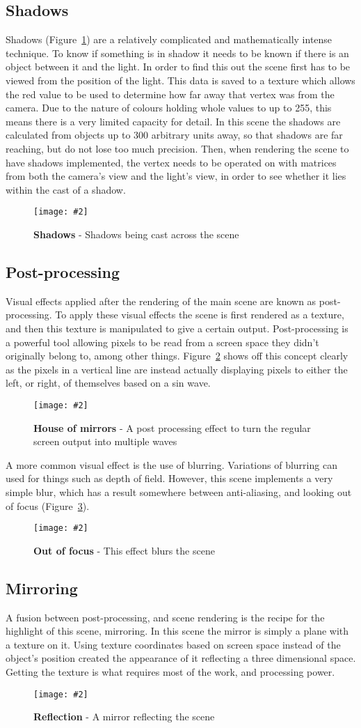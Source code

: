 \documentclass[10pt, a4paper]{article}
\newcommand{\figuremacro}[5]{
    \begin{figure}[#1]
        \centering
        \texttt{[image: \#2]}
        \caption[#3]{\textbf{#3}#4}
        \label{fig:#2}
    \end{figure}
}
\begin{document}
	\subsection{Shadows}
	Shadows (Figure~\ref{fig:shadows}) are a relatively complicated and mathematically intense technique.  To know if something is in shadow it needs to be known if there is an object between it and the light.  In order to find this out the scene first has to be viewed from the position of the light.  This data is saved to a texture which allows the red value to be used to determine how far away that vertex was from the camera.  Due to the nature of colours holding whole values to up to 255, this means there is a very limited capacity for detail.  In this scene the shadows are calculated from objects up to 300 arbitrary units away, so that shadows are far reaching, but do not lose too much precision.  Then, when rendering the scene to have shadows implemented, the vertex needs to be operated on with matrices from both the camera's view and the light's view, in order to see whether it lies within the cast of a shadow.
	\figuremacro{h}{shadows}{Shadows}{ - Shadows being cast across the scene}{1.0}
	
	\subsection{Post-processing}
	Visual effects applied after the rendering of the main scene are known as post-processing.  To apply these visual effects the scene is first rendered as a texture, and then this texture is manipulated to give a certain output. Post-processing is a powerful tool allowing pixels to be read from a screen space they didn't originally belong to, among other things.  Figure~\ref{fig:wiggle} shows off this concept clearly as the pixels in a vertical line are instead actually displaying pixels to either the left, or right, of themselves based on a sin wave.
	\figuremacro{h}{wiggle}{House of mirrors}{ - A post processing effect to turn the regular screen output into multiple waves}{1.0}
	
	A more common visual effect is the use of blurring.  Variations of blurring can used for things such as depth of field.  However, this scene implements a very simple blur, which has a result somewhere between anti-aliasing, and looking out of focus (Figure~\ref{fig:blur}).
	\figuremacro{h}{blur}{Out of focus}{ - This effect blurs the scene}{1.0}
	
	\subsection{Mirroring}
	A fusion between post-processing, and scene rendering is the recipe for the highlight of this scene, mirroring.  In this scene the mirror is simply a plane with a texture on it.  Using texture coordinates based on screen space instead of the object's position created the appearance of it reflecting a three dimensional space.  Getting the texture is what requires most of the work, and processing power.
	\figuremacro{h}{mirror}{Reflection}{ - A mirror reflecting the scene}{1.0}
	
\end{document}
